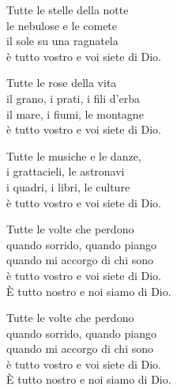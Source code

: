 
\strofa Tutte le stelle della notte\\
le nebulose e le comete\\
il sole su una ragnatela\\
è tutto vostro e voi siete di Dio.

\spazio

\strofa Tutte le rose della vita\\
il grano, i prati, i fili d'erba\\
il mare, i fiumi, le montagne\\
è tutto vostro e voi siete di Dio.

\spazio

\strofa Tutte le musiche e le danze,\\
i grattacieli, le astronavi\\
i quadri, i libri, le culture\\
è tutto vostro e voi siete di Dio.

\spazio

\strofa Tutte le volte che perdono\\
quando sorrido, quando piango\\
quando mi accorgo di chi sono\\
è tutto vostro e voi siete di Dio.\\
È tutto nostro e noi siamo di Dio.

\spazio

\strofa Tutte le volte che perdono\\
quando sorrido, quando piango\\
quando mi accorgo di chi sono\\
è tutto vostro e voi siete di Dio.\\
È tutto nostro e noi siamo di Dio.
